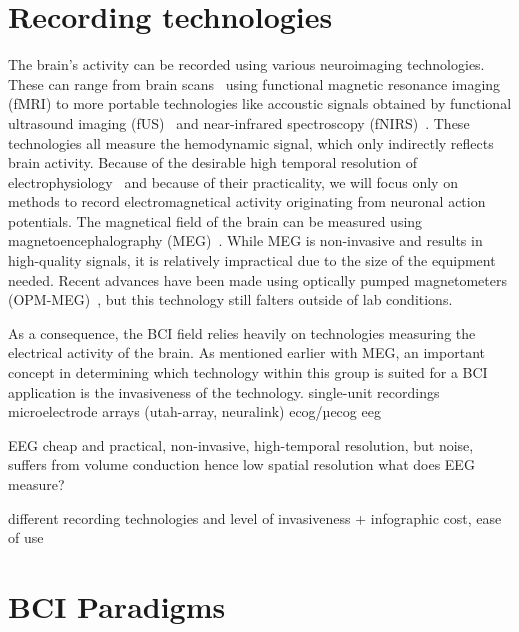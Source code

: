 


\section{Recording technologies}
\label{sec:bci-recording}
The brain's activity can be recorded using various neuroimaging
technologies.
These can range from brain scans~\cite{Weiskopf2004} using functional magnetic resonance imaging
(fMRI) to more portable technologies like accoustic signals obtained by functional ultrasound imaging
(fUS)~\cite{Zheng2023} and near-infrared spectroscopy
(fNIRS)~\cite{Borgheai2020}.
These technologies all measure the hemodynamic signal, which only indirectly
reflects brain activity.
Because of the desirable high temporal resolution of
electrophysiology~\cite{Easttom2021} and
because of their practicality, we will focus only on methods to record
electromagnetical activity originating from neuronal action potentials.
The magnetical field of the brain can be measured using magnetoencephalography
(MEG)~\cite{Mellinger2007}.
While MEG is non-invasive and results in high-quality signals, it is relatively
impractical due to the size of the equipment needed.
Recent advances have been made using optically pumped magnetometers
(OPM-MEG)~\cite{Wittevrongel2021}, but this technology still falters outside of
lab conditions.

As a consequence, the BCI field relies heavily on technologies measuring the
electrical activity of the brain.
As mentioned earlier with MEG, an important concept in determining which technology within this group is
suited for a BCI application is the invasiveness of the technology.
single-unit recordings
microelectrode arrays (utah-array, neuralink)
ecog/µecog
eeg

EEG cheap and practical, non-invasive, high-temporal resolution, but noise, suffers from volume
conduction hence low spatial resolution
what does EEG measure?





different recording technologies and level of invasiveness + infographic
cost, ease of use
\section{BCI Paradigms}
\label{sec:bci-paradigms}

